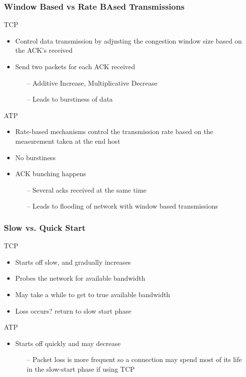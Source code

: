 \begin{frame}[t]
  \frametitle{Window Based vs Rate BAsed Transmissions}

  TCP
  \begin{itemize}
  \item Control data transmission by adjusting the congestion window size based on the ACK’s received
  \item Send two packets for each ACK received
    \begin{itemize}
      \item[--] Additive Increase, Multiplicative Decrease
      \item[--] Leads to burstiness of data
    \end{itemize}
  \end{itemize}

  \vfill

  ATP
  \begin{itemize}
  \item Rate-based mechanisms control the transmission rate based on the measurement taken at the end host
  \item No burstiness
  \item ACK bunching happens
    \begin{itemize}
      \item[--] Several acks received at the same time
      \item[--] Leads to flooding of network with window based transmissions
    \end{itemize}
  \end{itemize}
  
\end{frame}    

\begin{frame}[t]
  \frametitle{Slow vs. Quick Start}

  TCP
  \begin{itemize}
    \item Starts off slow, and gradually increases
    \item Probes the network for available bandwidth
    \item May take a while to get to true available bandwidth
    \item Loss occurs? return to slow start phase
  \end{itemize}

  \vfill
  
  ATP
  \begin{itemize}
  \item Starts off quickly and may decrease
    \begin{itemize}
    \item[--]Packet loss is more frequent so a connection may spend most of its life in the slow-start phase if using TCP
    \end{itemize}
  \end{itemize}
  
  
\end{frame}


